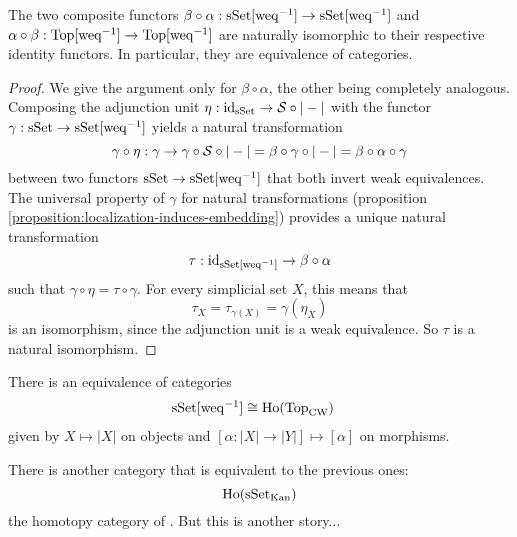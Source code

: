 \begin{theorem}
The two composite functors $\beta\circ\alpha:\sSet[\weq^\inv]\to\sSet[\weq^\inv]$ and $\alpha\circ\beta:\Top[\weq^\inv]\to\Top[\weq^\inv]$ are naturally isomorphic to their respective identity functors. In particular, they are equivalence of categories.
\end{theorem}

\begin{proof}
We give the argument only for $\beta\circ\alpha$, the other being completely analogous. Composing the adjunction unit $\eta:\id_\sSet\to\S\circ|-|$ with the functor $\gamma:\sSet\to\sSet[\weq^\inv]$ yields a natural transformation
\[\gamma\circ\eta:\gamma\to\gamma\circ\S\circ|-|=\beta\circ\gamma\circ|-|=\beta\circ\alpha\circ\gamma\]
between two functors $\sSet\to\sSet[\weq^\inv]$ that both invert weak equivalences. The universal property of $\gamma$ for natural transformations (proposition \ref{proposition:localization-induces-embedding}) provides a unique natural transformation \[\tau:\id_{\sSet[\weq^\inv]}\to\beta\circ\alpha\]
such that $\gamma\circ\eta=\tau\circ\gamma$. For every simplicial set $X$, this means that
\[\tau_X=\tau_{\gamma(X)}=\gamma(\eta_X)\]
is an isomorphism, since the adjunction unit is a weak equivalence. So $\tau$ is a natural isomorphism.
\end{proof}


\begin{corollary}
There is an equivalence of categories
\begin{align*}
    \sSet[\weq^\inv]&\cong\Ho(\Top_\text{\upshape CW})
\end{align*}
given by $X\mapsto|X|$ on objects and $[\alpha:|X|\to|Y|]\mapsto[\alpha]$ on morphisms.
\end{corollary}

\begin{remark}
There is another category that is equivalent to the previous ones:
\[\Ho(\sSet_\text{Kan})\]
the homotopy category of . But this is another story...
\end{remark}













